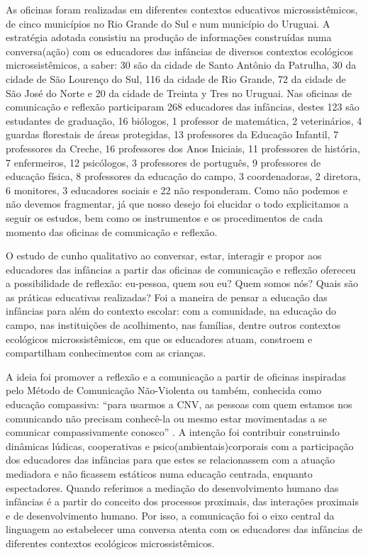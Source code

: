 \documentclass{textolivre}
\begin{document}
As oficinas foram realizadas em diferentes contextos educativos microssistêmicos, de cinco municípios no Rio Grande do Sul e num município do Uruguai. A estratégia adotada consistiu na produção de informações construídas numa conversa(ação) com os educadores das infâncias de diversos contextos ecológicos microssistêmicos, a saber: 30 são da cidade de Santo Antônio da Patrulha, 30 da cidade de São Lourenço do Sul, 116 da cidade de Rio Grande, 72 da cidade de São José do Norte e 20 da cidade de Treinta y Tres no Uruguai. Nas oficinas de comunicação e reflexão participaram 268 educadores das infâncias, destes 123 são estudantes de graduação, 16 biólogos, 1 professor de matemática, 2 veterinários, 4 guardas florestais de áreas protegidas, 13 professores da Educação Infantil, 7 professores da Creche, 16 professores dos Anos Iniciais, 11 professores de história, 7 enfermeiros, 12 psicólogos, 3 professores de português, 9 professores de educação física, 8 professores da educação do campo, 3 coordenadoras, 2 diretora, 6 monitores, 3 educadores sociais e 22 não responderam. Como não podemos e não devemos fragmentar, já que nosso desejo foi elucidar o todo explicitamos a seguir os estudos, bem como os instrumentos e os procedimentos de cada momento das oficinas de comunicação e reflexão. 

O estudo de cunho qualitativo ao conversar, estar, interagir e propor aos educadores das infâncias a partir das oficinas de comunicação e reflexão ofereceu a possibilidade de reflexão: eu-pessoa, quem sou eu? Quem somos nós? Quais são as práticas educativas realizadas? Foi a maneira de pensar a educação das infâncias para além do contexto escolar: com a comunidade, na educação do campo, nas instituições de acolhimento, nas famílias, dentre outros contextos ecológicos microssistêmicos, em que os educadores atuam, constroem e compartilham conhecimentos com as crianças. 

A ideia foi promover a reflexão e a comunicação a partir de oficinas inspiradas pelo Método de Comunicação Não-Violenta ou também, conhecida como educação compassiva: “para usarmos a CNV, as pessoas com quem estamos nos comunicando não precisam conhecê-la ou mesmo estar movimentadas a se comunicar compassivamente conosco” \cite[p. 24]{rosenberg2006}. A intenção foi contribuir construindo dinâmicas lúdicas, cooperativas e psico(ambientais)corporais com a participação dos educadores das infâncias para que estes se relacionassem com a atuação mediadora e não ficassem estáticos numa educação centrada, enquanto espectadores. Quando referimos a mediação do desenvolvimento humano das infâncias é a partir do conceito dos processos proximais, das interações proximais e de desenvolvimento humano. Por isso, a comunicação foi o eixo central da linguagem ao estabelecer uma conversa atenta com os educadores das infâncias de diferentes contextos ecológicos microssistêmicos.
\end{document}
